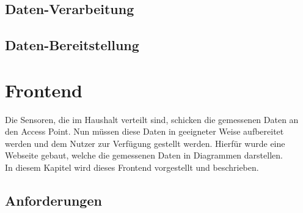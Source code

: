 \documentclass[12pt,a4paper,twoside]{article}
\begin{document}
\subsection{Daten-Verarbeitung}

\subsection{Daten-Bereitstellung}

\section{Frontend}
Die Sensoren, die im Haushalt verteilt sind, schicken die gemessenen Daten an den Access Point. Nun müssen diese Daten in geeigneter Weise aufbereitet werden und dem Nutzer zur Verfügung gestellt werden. Hierfür wurde eine Webseite gebaut, welche die gemessenen Daten in Diagrammen darstellen. \\
In diesem Kapitel wird dieses Frontend vorgestellt und beschrieben.

\subsection{Anforderungen}
\end{document}
